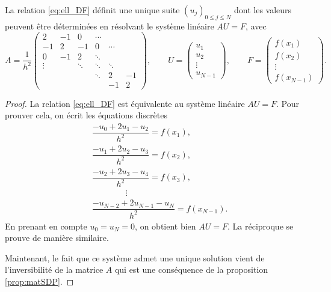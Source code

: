 \documentclass[12pt,a4paper,twoside]{article}
\begin{document}
\begin{proposition}
  La relation \eqref{eq:ell_DF} d\'efinit une unique suite $(u_j)_{0\leq j \leq N}$ dont les valeurs
  peuvent \^etre d\'etermin\'ees en r\'esolvant le syst\`eme lin\'eaire
  $A U = F$, avec 
  \begin{equation}
    \label{eq:mat_DF_Laplacien}
    A = \dfrac{1}{h^2} 
    \begin{pmatrix} 
      2 & -1 & 0 & \cdots
      \\
      -1 & 2 & -1 & 0 & \cdots
      \\
      0 & -1 & 2 & \ddots &
      \\
      \vdots & & \ddots & \ddots & \ddots
      \\
      & & &  \ddots & 2 & -1
      \\
      & &  & & -1 & 2
    \end{pmatrix} , \qquad U = 
    \begin{pmatrix}
      u_1 \\ u_2 \\ \vdots \\ u_{N-1}
    \end{pmatrix} , \qquad F = 
    \begin{pmatrix}
      f(x_1) \\ f(x_2) \\ \vdots \\ f(x_{N-1})
    \end{pmatrix} .
  \end{equation}
\end{proposition}

\begin{proof}
  La relation \eqref{eq:ell_DF} est \'equivalente au syst\`eme lin\'eaire $AU = F$.
  Pour prouver cela, on \'ecrit les \'equations discr\`etes
  \begin{align*}
    &\dfrac{-u_0 + 2 u_1 - u_2}{h^2} = f(x_1) ,
    \\
    &\dfrac{-u_1 + 2 u_2 - u_3}{h^2} = f(x_2) ,
    \\
    &\dfrac{-u_2 + 2 u_3 - u_4}{h^2} = f(x_3) ,
    \\
    & \qquad \qquad \vdots
    \\
    &\dfrac{-u_{N-2} + 2 u_{N-1} - u_N}{h^2} = f(x_{N-1}) .
  \end{align*}
  En prenant en compte $u_0 = u_N = 0$, on obtient bien $AU = F$.
  La r\'eciproque se prouve de mani\`ere similaire.

  Maintenant, le fait que ce syst\`eme admet une unique solution vient de l'inversibilit\'e
  de la matrice $A$ qui est une cons\'equence de la proposition \ref{prop:matSDP}.
\end{proof}
\end{document}
